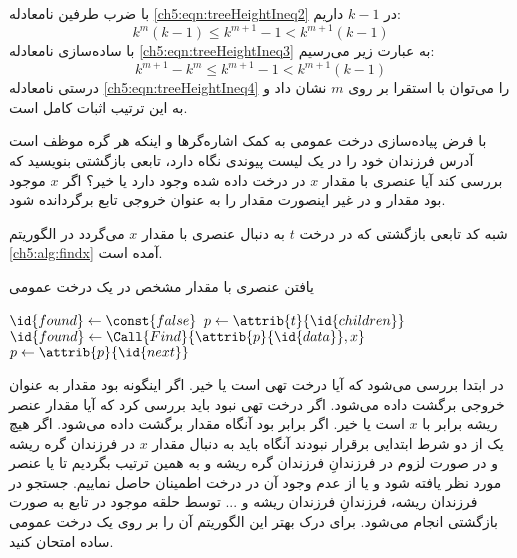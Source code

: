 با ضرب طرفین نامعادله {\ref{ch5:eqn:treeHeightIneq2}} در {$k-1$} داریم:
\begin{equation}
k^m(k-1) \leq k^{m+1}-1 < k^{m+1}(k-1)\label{ch5:eqn:treeHeightIneq3}
\end{equation}
با ساده‌سازی نامعادله {\ref{ch5:eqn:treeHeightIneq3}} به عبارت زیر می‌رسیم:
\begin{equation}
k^{m+1}-k^m \leq k^{m+1}-1 < k^{m+1}(k-1)\label{ch5:eqn:treeHeightIneq4}
\end{equation}
درستی نامعادله {\ref{ch5:eqn:treeHeightIneq4}} را می‌توان با استقرا بر روی {$m$} نشان داد و به این ترتیب اثبات کامل است.


 با فرض پیاده‌سازی درخت عمومی به کمک اشاره‌گرها و اینکه هر گره موظف است آدرس فرزندان خود را در یک لیست پیوندی نگاه دارد، تابعی بازگشتی بنویسید که بررسی کند آیا عنصری با مقدار {$x$} در درخت داده شده وجود دارد یا خیر؟ اگر {$x$} موجود بود مقدار {} و در غیر اینصورت مقدار {} را به عنوان خروجی تابع برگردانده شود.


شبه کد تابعی بازگشتی که در درخت {$t$} به دنبال عنصری با مقدار {$x$} می‌گردد در الگوریتم {\ref{ch5:alg:findx}} آمده است.
\begin{algorithm}
\caption{یافتن عنصری با مقدار مشخص در یک درخت عمومی}\label{ch5:alg:findx}
\begin{latin}
\begin{algorithmic}[1]
				\State	\Return
		\EndIf
				\State	\Return {}
		\EndIf
		\State	$\id{found} \gets \const{false}$
		\State	$p \gets \attrib{t}{\id{children}}$
				\State	$\id{found} \gets \Call{Find}{\attrib{p}{\id{data}},x}$
				\State	$p \gets \attrib{p}{\id{next}}$
		\EndWhile
		\State	\Return {}
\EndFunction
\end{algorithmic}
\end{latin}
\end{algorithm}

در ابتدا بررسی می‌شود که آیا درخت تهی است یا خیر. اگر اینگونه بود مقدار {} به عنوان خروجی برگشت داده می‌شود. اگر درخت تهی نبود باید بررسی کرد که آیا مقدار عنصر ریشه برابر با {$x$} است یا خیر. اگر برابر بود آنگاه مقدار {} برگشت داده می‌شود. اگر هیچ یک از دو شرط ابتدایی برقرار نبودند آنگاه باید به دنبال مقدار {$x$} در فرزندان گره ریشه و در صورت لزوم در فرزندانِ فرزندان گره ریشه و به همین ترتیب بگردیم تا یا عنصر مورد نظر یافته شود و یا از عدم وجود آن در درخت اطمینان حاصل نماییم. جستجو در فرزندان ریشه، فرزندانِ فرزندان ریشه و ... توسط حلقه موجود در تابع به صورت بازگشتی انجام می‌شود. برای درک بهتر این الگوریتم آن را بر روی یک درخت عمومی ساده امتحان کنید.

